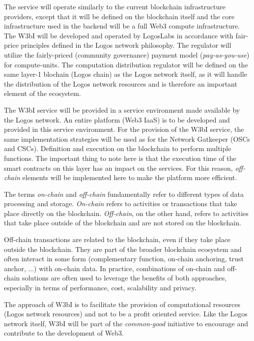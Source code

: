 \documentclass[]{article}
\begin{document}
The service will operate similarly to the current blockchain infrastructure providers, except that it will be defined on the blockchain itself and the core infrastructure used in the backend will be a full Web3 compute infrastructure.
The W3bI will be developed and operated by LogosLabs in accordance with fair-price principles defined in the Logos network philosophy.
The regulator will utilize the fairly-priced (community governance) payment model (\textit{pay-as-you-use}) \cite{WikipediaDoc-payu} for compute-units.
The computation distribution regulator will be defined on the same layer-1 blochain (Logos chain) as the Logos network itself, as it will handle the distribution of the Logos network resources and is therefore an important element of the ecosystem. 

The W3bI service will be provided in a service environment made available by the Logos network.
An entire platform (Web3 IaaS) is to be developed and provided in this service environment.
For the provision of the W3bI service, the same implementation strategies will be used as for the Network Gatkeeper (OSCs and CSCs). 
Definition and execution on the blockchain to perform multiple functions.
The important thing to note here is that the execution time of the smart contracts on this layer has an impact on the services. 
For this reason, \textit{off-chain} elements will be implemented here to make the platform more efficient. 

The terms \textit{on-chain} and \textit{off-chain} fundamentally refer to different types of data processing and storage.
\textit{On-chain} refers to activities or transactions that take place directly on the blockchain.
\textit{Off-chain}, on the other hand, refers to activities that take place outside of the blockchain and are not stored on the blockchain.

Off-chain transactions are related to the blockchain, even if they take place outside the blockchain. 
They are part of the broader blockchain ecosystem and often interact in some form (complementary function, on-chain anchoring, trust anchor, ...) with on-chain data.
In practice, combinations of on-chain and off-chain solutions are often used to leverage the benefits of both approaches, especially in terms of performance, cost, scalability and privacy.

The approach of W3bI is to facilitate the provision of computational resources (Logos network resources) and not to be a profit oriented service.
Like the Logos network itself, W3bI will be part of the \textit{common-good} initiative to encourage and contribute to the development of Web3.
\end{document}
